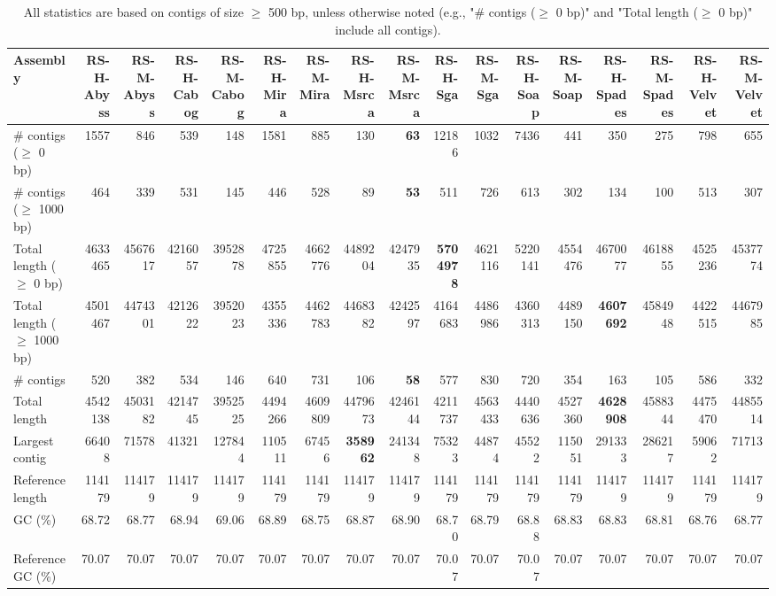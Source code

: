 \documentclass[12pt,a4paper]{article}
\begin{document}
\begin{table}[ht]
\begin{center}
\caption{All statistics are based on contigs of size $\geq$ 500 bp, unless otherwise noted (e.g., "\# contigs ($\geq$ 0 bp)" and "Total length ($\geq$ 0 bp)" include all contigs).}
\begin{tabular}{|l*{16}{|r}|}
\hline
Assembly & RS-H-Abyss & RS-M-Abyss & RS-H-Cabog & RS-M-Cabog & RS-H-Mira & RS-M-Mira & RS-H-Msrca & RS-M-Msrca & RS-H-Sga & RS-M-Sga & RS-H-Soap & RS-M-Soap & RS-H-Spades & RS-M-Spades & RS-H-Velvet & RS-M-Velvet \\ \hline
\# contigs ($\geq$ 0 bp) & 1557 & 846 & 539 & 148 & 1581 & 885 & 130 & {\bf 63} & 12186 & 1032 & 7436 & 441 & 350 & 275 & 798 & 655 \\ \hline
\# contigs ($\geq$ 1000 bp) & 464 & 339 & 531 & 145 & 446 & 528 & 89 & {\bf 53} & 511 & 726 & 613 & 302 & 134 & 100 & 513 & 307 \\ \hline
Total length ($\geq$ 0 bp) & 4633465 & 4567617 & 4216057 & 3952878 & 4725855 & 4662776 & 4489204 & 4247935 & {\bf 5704978} & 4621116 & 5220141 & 4554476 & 4670077 & 4618855 & 4525236 & 4537774 \\ \hline
Total length ($\geq$ 1000 bp) & 4501467 & 4474301 & 4212622 & 3952023 & 4355336 & 4462783 & 4468382 & 4242597 & 4164683 & 4486986 & 4360313 & 4489150 & {\bf 4607692} & 4584948 & 4422515 & 4467985 \\ \hline
\# contigs & 520 & 382 & 534 & 146 & 640 & 731 & 106 & {\bf 58} & 577 & 830 & 720 & 354 & 163 & 105 & 586 & 332 \\ \hline
Total length & 4542138 & 4503182 & 4214745 & 3952525 & 4494266 & 4609809 & 4479673 & 4246144 & 4211737 & 4563433 & 4440636 & 4527360 & {\bf 4628908} & 4588344 & 4475470 & 4485514 \\ \hline
Largest contig & 66408 & 71578 & 41321 & 127844 & 110511 & 67456 & {\bf 358962} & 241348 & 75323 & 44874 & 45522 & 115051 & 291333 & 286217 & 59062 & 71713 \\ \hline
Reference length & 114179 & 114179 & 114179 & 114179 & 114179 & 114179 & 114179 & 114179 & 114179 & 114179 & 114179 & 114179 & 114179 & 114179 & 114179 & 114179 \\ \hline
GC (\%) & 68.72 & 68.77 & 68.94 & 69.06 & 68.89 & 68.75 & 68.87 & 68.90 & 68.70 & 68.79 & 68.88 & 68.83 & 68.83 & 68.81 & 68.76 & 68.77 \\ \hline
Reference GC (\%) & 70.07 & 70.07 & 70.07 & 70.07 & 70.07 & 70.07 & 70.07 & 70.07 & 70.07 & 70.07 & 70.07 & 70.07 & 70.07 & 70.07 & 70.07 & 70.07 \\ \hline

\end{tabular}
\end{center}
\end{table}
\end{document}
